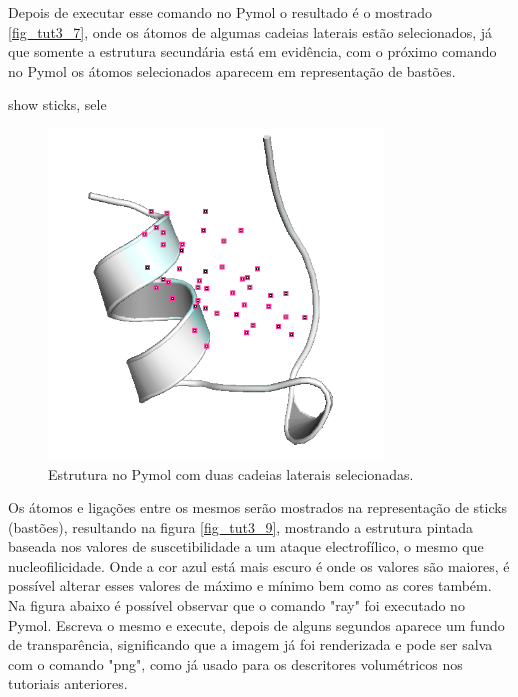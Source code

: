 \documentclass[a4paper,11pt]{refart}
\begin{document}
Depois de executar esse comando no Pymol o resultado é o mostrado \autoref{fig_tut3_7}, onde os átomos de algumas cadeias laterais estão selecionados, já que somente a estrutura secundária está em evidência, com o próximo comando no Pymol os átomos selecionados aparecem em representação de bastões.

\hspace*{-\leftmarginwidth}
\begin{minipage}{\fullwidth}
	\begin{pymol}show sticks, sele\end{pymol}
\end{minipage}

\hspace*{-\leftmarginwidth}
\begin{minipage}{\fullwidth}
	\begin{figure}[H]
		\begin{center}
			\includegraphics[width=3.5in]{images/tut3_img9}
			\caption{Estrutura no Pymol com duas cadeias laterais selecionadas.}
			\label{fig_tut3_7}
		\end{center}
	\end{figure}
\end{minipage}

Os átomos e ligações entre os mesmos serão mostrados na representação de sticks (bastões), resultando na figura \autoref{fig_tut3_9}, mostrando a estrutura pintada baseada nos valores de suscetibilidade a um ataque electrofílico,  o mesmo que nucleofilicidade. Onde a cor azul está mais escuro é onde os valores são maiores, é possível alterar esses valores de máximo e mínimo bem como as cores também. Na figura abaixo é possível observar que o comando "ray" foi executado no Pymol. Escreva o mesmo e execute, depois de alguns segundos aparece um fundo de  transparência, significando que a imagem já foi renderizada e pode ser salva com o comando "png", como já usado para os descritores volumétricos nos tutoriais anteriores. 
\end{document}
